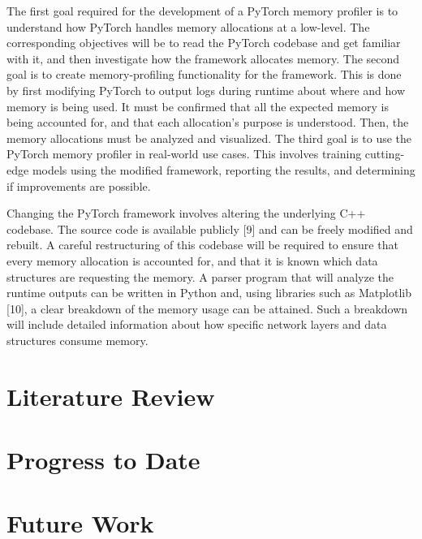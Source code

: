 \documentclass[12pt,letterpaper]{article}
\begin{document}
The first goal required for the development of a PyTorch memory profiler is to understand how PyTorch handles memory allocations at a low-level. The corresponding objectives will be to read the PyTorch codebase and get familiar with it, and then investigate how the framework allocates memory. The second goal is to create memory-profiling functionality for the framework. This is done by first modifying PyTorch to output logs during runtime about where and how memory is being used. It must be confirmed that all the expected memory is being accounted for, and that each allocation’s purpose is understood. Then, the memory allocations must be analyzed and visualized. The third goal is to use the PyTorch memory profiler in real-world use cases. This involves training cutting-edge models using the modified framework, reporting the results, and determining if improvements are possible.
\par

Changing the PyTorch framework involves altering the underlying C++ codebase. The source code is available publicly [9] and can be freely modified and rebuilt. A careful restructuring of this codebase will be required to ensure that every memory allocation is accounted for, and that it is known which data structures are requesting the memory. A parser program that will analyze the runtime outputs can be written in Python and, using libraries such as Matplotlib [10], a clear breakdown of the memory usage can be attained. Such a breakdown will include detailed information about how specific network layers and data structures consume memory.
\section{Literature Review}

\section{Progress to Date}


\section{Future Work}


\printbibliography
\end{document}
